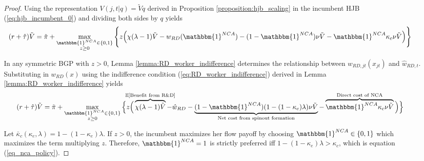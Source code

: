 \documentclass[11pt,english]{article}
\begin{document}
\begin{proof}
	Using the representation $V(j,t|q) = \tilde{V}q$ derived in Proposition \ref{proposition:hjb_scaling} in the incumbent HJB (\ref{eq:hjb_incumbent_0}) and dividing both sides by $q$ yields
	\begin{align}
	(r + \hat{\tau}) &\tilde{V} = \tilde{\pi} + \max_{\substack{\mathbbm{1}^{NCA} \in \{0,1\} \\ z \ge 0}} \Bigg\{ z \Big( \chi (\lambda -1) \tilde{V}- w_{RD}(\mathbbm{1}^{NCA}) - (1-\mathbbm{1}^{NCA}) \nu \tilde{V} - \mathbbm{1}^{NCA} \kappa_c \nu \tilde{V} \Big)\Bigg\} \label{eq:hjb_incumbent_1}
	\end{align}
	
	In any symmetric BGP with $z > 0$, Lemma \ref{lemma:RD_worker_indifference} determines the relationship between $w_{RD,jt}(x_{jt})$ and $\hat{w}_{RD,t}$.  Substituting in $w_{RD}(x)$ using the indifference condition (\ref{eq:RD_worker_indifference}) derived in Lemma \ref{lemma:RD_worker_indifference} yields
	\begin{align}
	(r + \hat{\tau}) \tilde{V} &= \tilde{\pi} + \max_{\substack{\mathbbm{1}^{NCA} \in \{0,1\} \\ z \ge 0}} \Big\{z \Big( \overbrace{\chi (\lambda - 1) \tilde{V}}^{\mathclap{\mathbb{E}[\textrm{Benefit from R\&D}]}}- \hat{w}_{RD} -  \underbrace{(1-\mathbbm{1}^{NCA})(1 - (1-\kappa_{e})\lambda)\nu \tilde{V}}_{\mathclap{\text{Net cost from spinout formation}}} - \overbrace{\mathbbm{1}^{NCA} \kappa_{c} \nu \tilde{V}}^{\mathclap{\text{Direct cost of NCA}}}\Big) \Big\} \label{eq:hjb_incumbent_workerIndiff}
	\end{align}

	
	Let $\bar{\kappa}_c (\kappa_e, \lambda) = 1 - (1-\kappa_e)\lambda$. If $z > 0$, the incumbent maximizes her flow payoff by choosing $\mathbbm{1}^{NCA} \in \{0,1\}$ which maximizes the term multiplying $z$. Therefore, $\mathbbm{1}^{NCA} = 1$ is strictly preferred iff $1 - (1-\kappa_e) \lambda > \kappa_c$, which is equation (\ref{eq_nca_policy}).
\end{proof}
\end{document}
